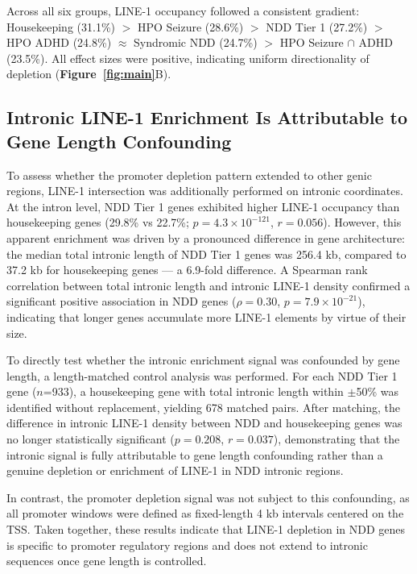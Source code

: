 \documentclass[11pt, a4paper]{article}
\newcommand{\Fig}[1]{\textbf{Figure~\ref{#1}}}
\begin{document}
Across all six groups, LINE-1 occupancy followed a consistent
gradient: Housekeeping (31.1\%) $>$ HPO Seizure (28.6\%) $>$
NDD Tier 1 (27.2\%) $>$ HPO ADHD (24.8\%) $\approx$
Syndromic NDD (24.7\%) $>$ HPO Seizure $\cap$ ADHD (23.5\%).
All effect sizes were positive, indicating uniform directionality
of depletion (\Fig{fig:main}B).

\subsection*{Intronic LINE-1 Enrichment Is Attributable to
Gene Length Confounding}

To assess whether the promoter depletion pattern extended to
other genic regions, LINE-1 intersection was additionally
performed on intronic coordinates. At the intron level, NDD
Tier 1 genes exhibited higher LINE-1 occupancy than housekeeping
genes (29.8\% vs 22.7\%; $p = 4.3 \times 10^{-121}$,
$r = 0.056$). However, this apparent enrichment was driven by
a pronounced difference in gene architecture: the median total
intronic length of NDD Tier 1 genes was 256.4 kb, compared to
37.2 kb for housekeeping genes --- a 6.9-fold difference.
A Spearman rank correlation between total intronic length and
intronic LINE-1 density confirmed a significant positive
association in NDD genes ($\rho = 0.30$, $p = 7.9 \times 10^{-21}$),
indicating that longer genes accumulate more LINE-1 elements
by virtue of their size.

To directly test whether the intronic enrichment signal was
confounded by gene length, a length-matched control analysis
was performed. For each NDD Tier 1 gene ($n$=933), a
housekeeping gene with total intronic length within $\pm$50\%
was identified without replacement, yielding 678 matched pairs.
After matching, the difference in intronic LINE-1 density
between NDD and housekeeping genes was no longer statistically
significant ($p = 0.208$, $r = 0.037$), demonstrating that the
intronic signal is fully attributable to gene length
confounding rather than a genuine depletion or enrichment of
LINE-1 in NDD intronic regions.

In contrast, the promoter depletion signal was not subject to
this confounding, as all promoter windows were defined as
fixed-length 4 kb intervals centered on the TSS.
Taken together, these results indicate that LINE-1 depletion in NDD
genes is specific to promoter regulatory regions and does not
extend to intronic sequences once gene length is controlled.
\end{document}
